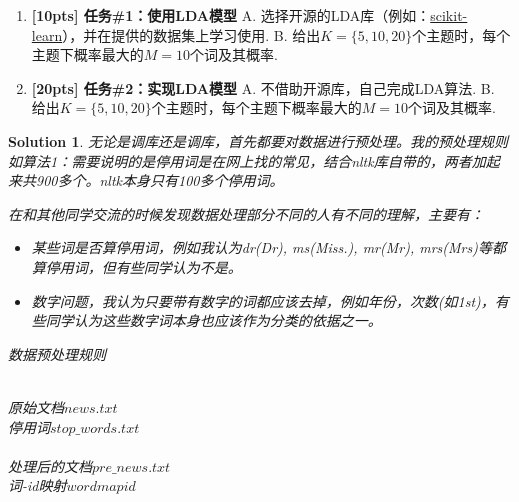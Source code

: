 \documentclass[a4paper,UTF8]{article}
\numberwithin{equation}{section}
\newtheorem*{mySol}{Solution}
\begin{document}
\begin{enumerate}[(1)]
	\item \textbf{[10pts] 任务\#1：使用LDA模型} 
	\subitem A. 选择开源的LDA库（例如：\href{https://scikit-learn.org/stable/modules/generated/sklearn.decomposition.LatentDirichletAllocation.html}{scikit-learn}），并在提供的数据集上学习使用.
	\subitem B. 给出$K=\{5,10,20\}$个主题时，每个主题下概率最大的$M=10$个词及其概率.
	\item \textbf{[20pts] 任务\#2：实现LDA模型} 
	\subitem A. 不借助开源库，自己完成LDA算法.
	\subitem B. 给出$K=\{5,10,20\}$个主题时，每个主题下概率最大的$M=10$个词及其概率.
\end{enumerate}
\begin{mySol} 
	
	无论是调库还是调库，首先都要对数据进行预处理。我的预处理规则如算法1：需要说明的是停用词是在网上找的常见，结合nltk库自带的，两者加起来共900多个。nltk本身只有100多个停用词。
	
	在和其他同学交流的时候发现数据处理部分不同的人有不同的理解，主要有：
	\begin{itemize}
		\item[1)] 某些词是否算停用词，例如我认为dr(Dr), ms(Miss.), mr(Mr), mrs(Mrs)等都算停用词，但有些同学认为不是。
		\item[2)] 数字问题，我认为只要带有数字的词都应该去掉，例如年份，次数(如1st)，有些同学认为这些数字词本身也应该作为分类的依据之一。
	\end{itemize}

	\begin{algorithm}[htb]
		\caption{ 数据预处理规则 }
		\label{alg1}
		 \\
		原始文档$news.txt$ \\
		停用词$stop\_words.txt$ \\
		 \\
		处理后的文档$pre\_news.txt$ \\
		词-id映射$wordmapid$
		\begin{algorithmic}[1]
				\ENDFOR
			\ENDFOR
		\end{algorithmic}
	\end{algorithm}


\end{mySol}
\end{document}
